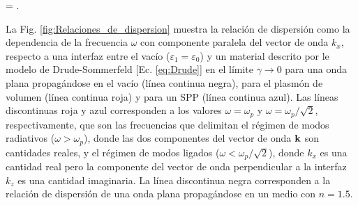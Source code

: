 	\begin{tcolorbox}[title =Frecuencia de resonancia del SPP, ams align,  breakable ]
	\omega = .
	\end{tcolorbox}\vspace*{-.75em}\noindent

La Fig. \ref{fig:Relaciones_de_dispersion} muestra la relación de dispersión como la dependencia de la frecuencia $\omega$ con componente paralela del vector de onda $k_x$, respecto a una interfaz entre el vacío ($\varepsilon_1=\varepsilon_0$) y un material descrito por le modelo de Drude-Sommerfeld [Ec. \eqref{eq:Drude}] en el límite $\gamma\to 0$ para una onda plana propagándose en el vacío (línea continua negra), para el plasmón de volumen (línea continua roja) y para un SPP (línea continua azul). Las líneas discontinuas roja y azul corresponden a los valores $\omega=\omega_p$ y $\omega=\omega_p/\sqrt{2}$, respectivamente, que son las frecuencias que delimitan el régimen de modos radiativos ($\omega>\omega_p$), donde las dos componentes del vector de onda $\vb{k}$ son cantidades reales, y el régimen de modos ligados ($\omega<\omega_p/\sqrt{2}$), donde $k_x$ es una cantidad real pero la componente del vector de onda perpendicular a la interfaz $k_z$ es una cantidad imaginaria. La línea discontinua negra corresponden a la relación de dispersión de una onda plana propagándose  en un medio con $n=1.5$.

